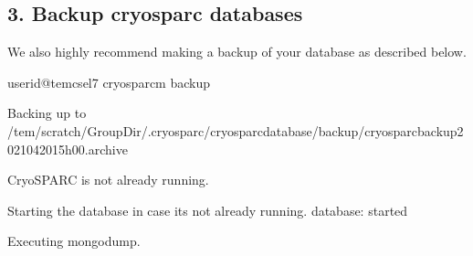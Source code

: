 \documentclass[a4paper,11pt,english]{sphinxmanual}
\begin{document}
\subsection{3. Back\sphinxhyphen{}up cryosparc databases}
\label{\detokenize{faq:back-up-cryosparc-databases}}
\sphinxAtStartPar
We also highly recommend making a backup of your database as described below.

\begin{sphinxVerbatim}[commandchars=\\\{\}]
userid@tem\PYGZhy{}cs\PYGZhy{}el7 \PYGZdl{}\PYGZgt{} cryosparcm backup

Backing up to /tem/scratch/\PYGZlt{}GroupDir\PYGZgt{}/.cryosparc/cryosparc\PYGZus{}database/backup/cryosparc\PYGZus{}backup\PYGZus{}2021\PYGZus{}04\PYGZus{}20\PYGZus{}15h00.archive

CryoSPARC is not already running.

Starting the database in case it\PYGZsq{}s not already running.
database: started

Executing mongodump.


\end{sphinxVerbatim}
\end{document}
